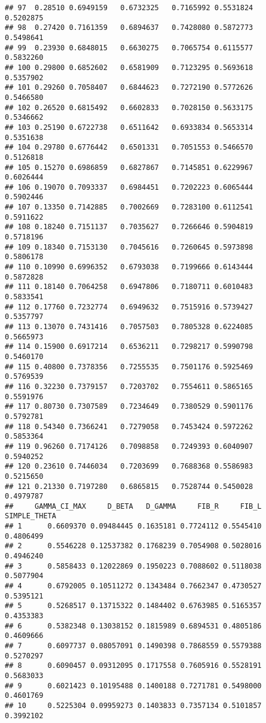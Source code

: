\documentclass[]{article}
\begin{document}
\begin{verbatim}
## 97  0.28510 0.6949159   0.6732325   0.7165992 0.5531824    0.5202875
## 98  0.27420 0.7161359   0.6894637   0.7428080 0.5872773    0.5498641
## 99  0.23930 0.6848015   0.6630275   0.7065754 0.6115577    0.5832260
## 100 0.29800 0.6852602   0.6581909   0.7123295 0.5693618    0.5357902
## 101 0.29260 0.7058407   0.6844623   0.7272190 0.5772626    0.5466580
## 102 0.26520 0.6815492   0.6602833   0.7028150 0.5633175    0.5346662
## 103 0.25190 0.6722738   0.6511642   0.6933834 0.5653314    0.5351638
## 104 0.29780 0.6776442   0.6501331   0.7051553 0.5466570    0.5126818
## 105 0.15270 0.6986859   0.6827867   0.7145851 0.6229967    0.6026444
## 106 0.19070 0.7093337   0.6984451   0.7202223 0.6065444    0.5902446
## 107 0.13350 0.7142885   0.7002669   0.7283100 0.6112541    0.5911622
## 108 0.18240 0.7151137   0.7035627   0.7266646 0.5904819    0.5718196
## 109 0.18340 0.7153130   0.7045616   0.7260645 0.5973898    0.5806178
## 110 0.10990 0.6996352   0.6793038   0.7199666 0.6143444    0.5872828
## 111 0.18140 0.7064258   0.6947806   0.7180711 0.6010483    0.5833541
## 112 0.17760 0.7232774   0.6949632   0.7515916 0.5739427    0.5357797
## 113 0.13070 0.7431416   0.7057503   0.7805328 0.6224085    0.5665973
## 114 0.15900 0.6917214   0.6536211   0.7298217 0.5990798    0.5460170
## 115 0.40800 0.7378356   0.7255535   0.7501176 0.5925469    0.5769539
## 116 0.32230 0.7379157   0.7203702   0.7554611 0.5865165    0.5591976
## 117 0.80730 0.7307589   0.7234649   0.7380529 0.5901176    0.5792781
## 118 0.54340 0.7366241   0.7279058   0.7453424 0.5972262    0.5853364
## 119 0.96260 0.7174126   0.7098858   0.7249393 0.6040907    0.5940252
## 120 0.23610 0.7446034   0.7203699   0.7688368 0.5586983    0.5215650
## 121 0.21330 0.7197280   0.6865815   0.7528744 0.5450028    0.4979787
##     GAMMA_CI_MAX     D_BETA   D_GAMMA     FIB_R     FIB_L SIMPLE_THETA
## 1      0.6609370 0.09484445 0.1635181 0.7724112 0.5545410    0.4806499
## 2      0.5546228 0.12537382 0.1768239 0.7054908 0.5028016    0.4946240
## 3      0.5858433 0.12022869 0.1950223 0.7088602 0.5118038    0.5077904
## 4      0.6792005 0.10511272 0.1343484 0.7662347 0.4730527    0.5395121
## 5      0.5268517 0.13715322 0.1484402 0.6763985 0.5165357    0.4353383
## 6      0.5382348 0.13038152 0.1815989 0.6894531 0.4805186    0.4609666
## 7      0.6097737 0.08057091 0.1490398 0.7868559 0.5579388    0.5270297
## 8      0.6090457 0.09312095 0.1717558 0.7605916 0.5528191    0.5683033
## 9      0.6021423 0.10195488 0.1400188 0.7271781 0.5498000    0.4601769
## 10     0.5225304 0.09959273 0.1403833 0.7357134 0.5101857    0.3992102

\end{verbatim}
\end{document}

